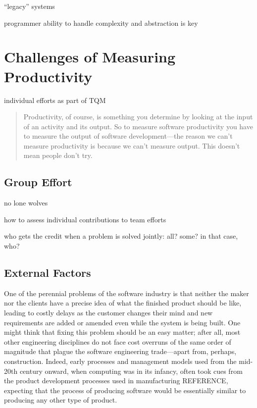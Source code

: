 \documentclass[letterpaper, 10pt]{report}
\begin{document}
``legacy'' systems

programmer ability to handle complexity and abstraction is key

\section{Challenges of Measuring Productivity}
individual efforts as part of TQM

\cite{fowler:cannotmeasure}
\begin{quote}
Productivity, of course, is something you determine by looking at the input of an activity and its output. 
So to measure software productivity you have to measure the output of software development---the reason we can't measure productivity is because we can't measure output. 
This doesn't mean people don't try. 
\end{quote}


\subsection{Group Effort}
no lone wolves

how to assess individual contributions to team efforts

who gets the credit when a problem is solved jointly: all? some? in that case, who?

\subsection{External Factors}
One of the perennial problems of the software industry is that neither the maker nor the clients have a precise idea of what the finished product should be like, leading to costly delays as the customer changes their mind and new requirements are added or amended even while the system is being built.
One might think that fixing this problem should be an easy matter; after all, most other engineering disciplines do not face cost overruns of the same order of magnitude that plague the software engineering trade---apart from, perhaps, construction. 
Indeed, early processes and management models used from the mid-20th century onward, when computing was in its infancy, often took cues from the product development processes used in manufacturing REFERENCE, expecting that the process of producing software would be essentially similar to producing any other type of product.
\end{document}
